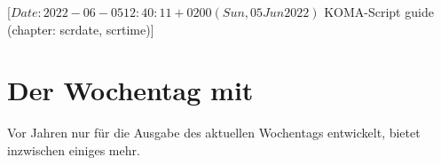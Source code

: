 %
%
%
%
%
%
%

                 [$Date: 2022-06-05 12:40:11 +0200 (Sun, 05 Jun 2022) $
                  KOMA-Script guide (chapter: scrdate, scrtime)]

\chapter{Der Wochentag mit }
\BeginIndexGroup
{}

\iffalse%
Ursprünglich sollte das Paket \Package{scrdate} lediglich den Wochentag zum
aktuellen Datum liefern. Inzwischen bietet es dies und etwas mehr für jedes
beliebige Datum im Gregorianischen Kalender.%
\else%
Vor \the\numexpr{}\relax{} Jahren nur für die Ausgabe des aktuellen
Wochentags entwickelt, bietet  inzwischen einiges mehr.
\fi

